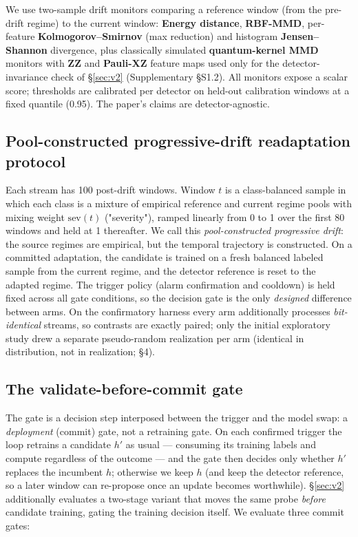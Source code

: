\documentclass[a4paper,fleqn]{cas-sc}
\begin{document}
We use two-sample drift monitors comparing a reference window (from the pre-drift regime) to the current window: \textbf{Energy distance}, \textbf{RBF-MMD}, per-feature \textbf{Kolmogorov--Smirnov} (max reduction) and histogram \textbf{Jensen--Shannon} divergence, plus classically simulated \textbf{quantum-kernel MMD} monitors with \textbf{ZZ} and \textbf{Pauli-XZ} feature maps used only for the detector-invariance check of \S\ref{sec:v2} (Supplementary \S S1.2). All monitors expose a scalar score; thresholds are calibrated per detector on held-out calibration windows at a fixed quantile (0.95). The paper's claims are detector-agnostic.


\subsection{Pool-constructed progressive-drift readaptation protocol}


Each stream has 100 post-drift windows. Window $t$ is a class-balanced sample in which each class is a mixture of empirical reference and current regime pools with mixing weight $\mathrm{sev}(t)$ ("severity"), ramped linearly from 0 to 1 over the first 80 windows and held at 1 thereafter. We call this \emph{pool-constructed progressive drift}: the source regimes are empirical, but the temporal trajectory is constructed. On a committed adaptation, the candidate is trained on a fresh balanced labeled sample from the current regime, and the detector reference is reset to the adapted regime. The trigger policy (alarm confirmation and cooldown) is held fixed across all gate conditions, so the decision gate is the only \emph{designed} difference between arms. On the confirmatory harness every arm additionally processes \emph{bit-identical} streams, so contrasts are exactly paired; only the initial exploratory study drew a separate pseudo-random realization per arm (identical in distribution, not in realization; \S4).


\subsection{The validate-before-commit gate}
\label{sec:gates}


The gate is a decision step interposed between the trigger and the model swap: a \emph{deployment} (commit) gate, not a retraining gate. On each confirmed trigger the loop retrains a candidate $h'$ as usual --- consuming its training labels and compute regardless of the outcome --- and the gate then decides only whether $h'$ replaces the incumbent $h$; otherwise we keep $h$ (and keep the detector reference, so a later window can re-propose once an update becomes worthwhile). \S\ref{sec:v2} additionally evaluates a two-stage variant that moves the same probe \emph{before} candidate training, gating the training decision itself. We evaluate three commit gates:
\end{document}
